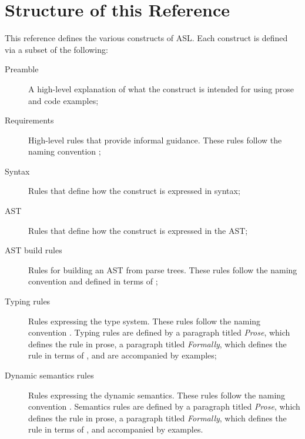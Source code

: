 \section{Structure of this Reference}
This reference defines the various constructs of ASL.
Each construct is defined via a subset of the following:
\begin{description}
    \item[Preamble] A high-level explanation of what the construct is intended for using
        prose and code examples;
    \item[Requirements] High-level rules that provide informal guidance.
        These rules follow the naming convention ;
    \item[Syntax] Rules that define how the construct is expressed in syntax;
    \item[AST] Rules that define how the construct is expressed in the AST;
    \item[AST build rules] Rules for building an AST from parse trees.
        These rules follow the naming convention 
        and defined in terms of \inferencerules;
    \item[Typing rules] Rules expressing the type system.
        These rules follow the naming convention .
        Typing rules are defined by a paragraph titled \emph{Prose},
        which defines the rule in prose,
        a paragraph titled \emph{Formally}, which defines the rule in terms of \inferencerules,
        and are accompanied by examples;
    \item[Dynamic semantics rules] Rules expressing the dynamic semantics.
        These rules follow the naming convention .
        Semantics rules are defined by a paragraph titled \emph{Prose},
        which defines the rule in prose,
        a paragraph titled \emph{Formally}, which defines the rule in terms of \inferencerules,
        and accompanied by examples.
\end{description}

